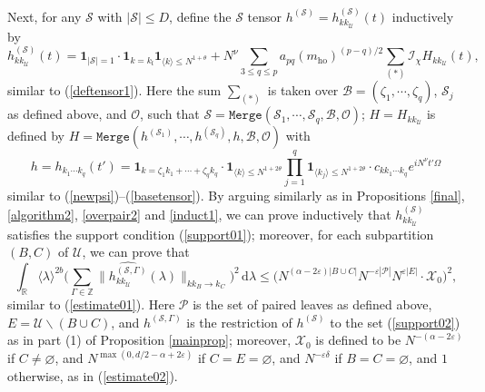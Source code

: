 \documentclass[11 pt,reqno]{amsart}
\theoremstyle{definition}
\theoremstyle{remark}
\numberwithin{equation}{section}
\newcommand{\Sc}{\mathcal{S}}
\newcommand{\Ic}{\mathcal{I}}
\newcommand{\Pc}{\mathcal{P}}
\newcommand{\Uc}{\mathcal{U}}
\newcommand{\Xc}{\mathcal{X}}
\newcommand{\Rb}{\mathbb{R}}
\newcommand{\Zb}{\mathbb{Z}}
\newcommand{\lf}{\mathfrak{l}}
\newcommand{\Bs}{\mathscr{B}}
\newcommand{\Os}{\mathscr{O}}
\begin{document}
{Next, for any $\Sc$ with $|\Sc|\leq D$, define the $\Sc$ tensor $h^{(\Sc)}=h_{kk_\Uc}^{(\Sc)}(t)$ inductively by
\begin{equation}\label{defhsnew}h_{kk_\Uc}^{(\Sc)}(t)=\mathbf{1}_{|\Sc|=1}\cdot\mathbf{1}_{k=k_\lf}\mathbf{1}_{\langle k\rangle\leq N^{1+\theta}}+N^\nu\sum_{3\leq q\leq p}a_{pq}(m_{\mathrm{ho}})^{(p-q)/2}\sum_{(*)}\Ic_\chi H_{kk_\Uc}(t),
\end{equation} similar to (\ref{deftensor1}). Here the sum $\sum_{(*)}$ is taken over $\Bs=(\zeta_1,\cdots,\zeta_q)$, $\Sc_j$ as defined above, and $\Os$, such that $\Sc=\mathtt{Merge}(\Sc_1,\cdots,\Sc_q,\Bs,\Os)$; $H=H_{kk_\Uc}$ is defined by $H=\mathtt{Merge}(h^{(\Sc_1)},\cdots,h^{(\Sc_q)},h,\Bs,\Os)$ with \begin{equation}\label{basetensorat}h=h_{k_1\cdots k_q}(t')=\mathbf{1}_{k=\zeta_1k_1+\cdots +\zeta_qk_q}\cdot\mathbf{1}_{\langle k\rangle\leq N^{1+2\theta}}\prod_{j=1}^q\mathbf{1}_{\langle k_j\rangle\leq N^{1+2\theta}}\cdot c_{kk_1\cdots k_q}e^{iN^\nu t'\Omega}\end{equation} similar to (\ref{newpsi})--(\ref{basetensor}). By arguing similarly as in Propositions \ref{final}, \ref{algorithm2}, \ref{overpair2} and \ref{induct1}, we can prove inductively that $h_{kk_\Uc}^{(\Sc)}$ satisfies the support condition (\ref{support01}); moreover, for each subpartition $(B,C)$ of $\Uc$, we can prove that
\begin{equation}\label{tensorbdan}\int_\Rb\langle\lambda\rangle^{2b}\bigg(\sum_{\Gamma\in\Zb}\|\widehat{h_{kk_\Uc}^{(\Sc,\Gamma)}}(\lambda)\|_{kk_B\to k_C}\bigg)^2\,\mathrm{d}\lambda\leq \big( N^{(\alpha-2\varepsilon)|B\cup C|}N^{-\varepsilon|\Pc|}N^{\varepsilon|E|}\cdot \Xc_0\big)^2,
\end{equation} similar to (\ref{estimate01}). Here $\Pc$ is the set of paired leaves as defined above, $E=\Uc\backslash(B\cup C)$, and $h^{(\Sc,\Gamma)}$ is the restriction of $h^{(\Sc)}$ to the set (\ref{support02}) as in part (1) of Proposition \ref{mainprop}; moreover, $\Xc_0$ is defined to be $N^{-(\alpha-2\varepsilon)}$ if $C\neq\varnothing$, and $N^{\max(0,d/2-\alpha+2\varepsilon)}$ if $C=E=\varnothing$, and $N^{-\varepsilon\delta}$ if $B=C=\varnothing$, and $1$ otherwise, as in (\ref{estimate02}). 

}
\end{document}
